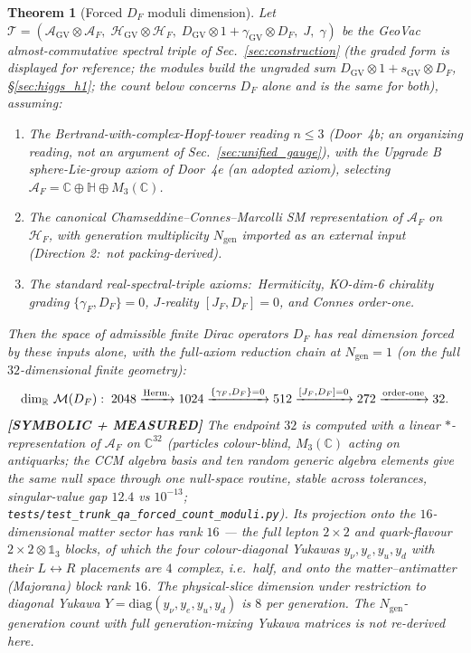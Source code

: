 \documentclass[11pt]{article}
\newtheorem{theorem}{Theorem}
\begin{document}
\begin{theorem}[Forced $D_F$ moduli dimension]
\label{thm:forced_count}
Let $\mathcal{T} = (\mathcal{A}_{\mathrm{GV}} \otimes \mathcal{A}_F,\;
\mathcal{H}_{\mathrm{GV}} \otimes \mathcal{H}_F,\;
D_{\mathrm{GV}} \otimes 1 + \gamma_{\mathrm{GV}} \otimes D_F,\; J,\; \gamma)$ be the
GeoVac almost-commutative spectral triple of
Sec.~\ref{sec:construction} (the graded form is displayed for
reference; the modules build the ungraded sum
$D_{\mathrm{GV}} \otimes 1 + s_{\mathrm{GV}} \otimes D_F$, \S\ref{sec:higgs_h1};
the count below concerns $D_F$ alone and is the same for both),
assuming:
\begin{enumerate}
\item The Bertrand-with-complex-Hopf-tower reading $n \le 3$
  (Door~4b; an organizing reading, not an argument of
  Sec.~\ref{sec:unified_gauge}), with the Upgrade B sphere-Lie-group
  axiom of Door~4e (an adopted axiom), selecting $\mathcal{A}_F = \mathbb{C} \oplus
  \mathbb{H} \oplus M_3(\mathbb{C})$.
\item The canonical Chamseddine--Connes--Marcolli SM representation of
  $\mathcal{A}_F$ on $\mathcal{H}_F$, with generation multiplicity
  $N_{\mathrm{gen}}$ imported as an external input (Direction 2:\ not
  packing-derived).
\item The standard real-spectral-triple axioms:\ Hermiticity,
  KO-dim-6 chirality grading $\{\gamma_F, D_F\} = 0$,
  $J$-reality $[J_F, D_F] = 0$, and Connes order-one.
\end{enumerate}
Then the space of admissible finite Dirac operators $D_F$ has real
dimension forced by these inputs alone, with the full-axiom reduction
chain at $N_{\mathrm{gen}} = 1$ (on the full $32$-dimensional finite
geometry):
\begin{equation}
\label{eq:forced_count_chain}
\dim_{\mathbb{R}}\, \mathcal{M}(D_F)
:\; 2048 \xrightarrow{\textnormal{Herm.}} 1024
     \xrightarrow{\{\gamma_F, D_F\}=0} 512
     \xrightarrow{[J_F, D_F]=0} 272
     \xrightarrow{\text{order-one}} 32 .
\end{equation}
\textbf{[SYMBOLIC + MEASURED]} The endpoint $32$ is computed with a linear
$*$-representation of $\mathcal{A}_F$ on $\mathbb{C}^{32}$ (particles
colour-blind, $M_3(\mathbb{C})$ acting on antiquarks; the CCM algebra
basis and ten random generic algebra elements give the same null space
through one null-space routine, stable across tolerances, singular-value
gap $12.4$ vs $10^{-13}$;
\texttt{tests/test\_trunk\_qa\_forced\_count\_moduli.py}).  Its projection
onto the $16$-dimensional matter sector has rank $16$ --- the \emph{full}
lepton $2\times2$ and quark-flavour $2\times2 \otimes \mathbb{1}_3$ blocks, of
which the four colour-diagonal Yukawas $y_\nu, y_e, y_u, y_d$ with their
$L \leftrightarrow R$ placements are $4$ complex, i.e.\ \emph{half},
and onto the matter--antimatter (Majorana) block rank $16$.
The physical-slice dimension under
restriction to diagonal Yukawa
$Y = \mathrm{diag}(y_\nu, y_e, y_u, y_d)$ is $8$ per generation.  The
$N_{\mathrm{gen}}$-generation count with full generation-mixing Yukawa
matrices is not re-derived here.
\end{theorem}
\end{document}
